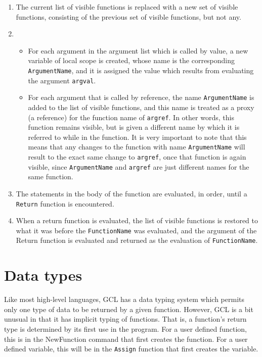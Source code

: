 \begin{enumerate}
\item
The current list of visible functions is 
replaced with a new set of visible functions, consisting of the
previous set of visible functions, but not any.
 
\item
\begin{itemize}
\item
For each argument in the argument list which is called by
value, a new variable of local scope is created, whose name is the
corresponding \verb+ArgumentName+, and it is assigned the value
which results from evaluating the argument \verb+argval+.  
\item
For each
argument that is called by reference, the name \verb+ArgumentName+ is
added to the list of visible functions, and this name is treated as a
proxy (a reference) for the function name of \verb+argref+.  In other
words, this function remains visible, but is given a different name by
which it is referred to while in the function.  It is very important
to note that this means that any changes to the function with name
\verb+ArgumentName+ will result to the exact same change to
\verb+argref+, once that function is again visible, since
\verb+ArgumentName+ and \verb+argref+ are just different names for the
same function.
\end{itemize}

\item
The statements in the body of the function are evaluated, in
order, until a \verb+Return+ function is encountered.  

\item
When a return function is evaluated, the list of visible
functions is restored to what it was before the \verb+FunctionName+
was evaluated, and the argument of the Return function is evaluated
and returned as the evaluation of \verb+FunctionName+. 
\end{enumerate}

\section{Data types}

Like most high-level languages, GCL has a data typing system which
permits only one type of data to be returned by a given function.
However, GCL is a bit unusual in that it has implicit typing of
functions.  That is, a function's return type is determined by its
first use in the program.  For a user defined function, this is in the
NewFunction command that first creates the function.  For a user
defined variable, this will be in the \verb+Assign+ function that
first creates the variable.

